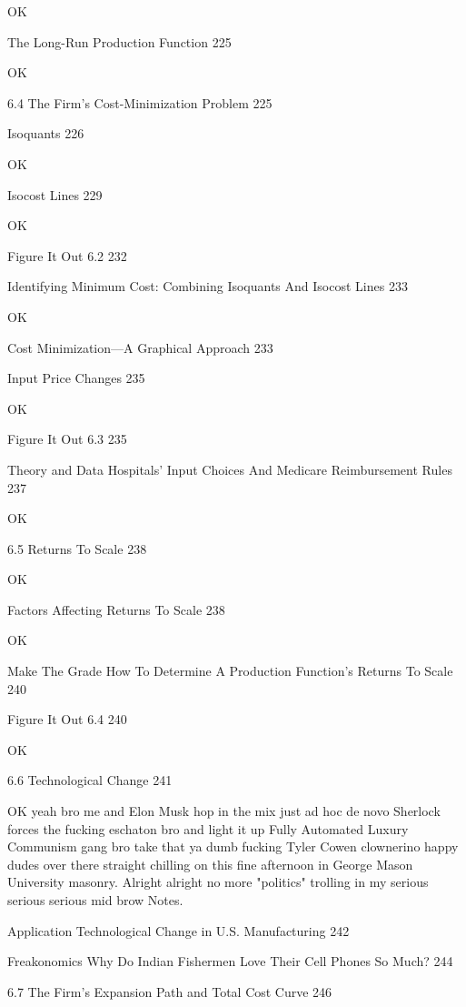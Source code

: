 OK

The Long-Run Production Function 225

OK

6.4 The Firm's Cost-Minimization Problem 225



Isoquants 226

OK

Isocost Lines 229

OK

Figure It Out 6.2 232



Identifying Minimum Cost: Combining Isoquants And Isocost Lines 233

OK

Cost Minimization—A Graphical Approach 233



Input Price Changes 235

OK

Figure It Out 6.3 235



Theory and Data Hospitals' Input Choices And Medicare Reimbursement Rules 237

OK

6.5 Returns To Scale 238

OK

Factors Affecting Returns To Scale 238

OK

Make The Grade How To Determine A Production Function's Returns To Scale 240



Figure It Out 6.4 240

OK

6.6 Technological Change 241

OK yeah bro me and Elon Musk hop in the mix just ad hoc de novo Sherlock forces the fucking eschaton bro and light it up Fully Automated Luxury Communism gang bro take that ya dumb fucking Tyler Cowen clownerino happy dudes over there straight chilling on this fine afternoon in George Mason University masonry. Alright alright no more "politics" trolling in my serious serious serious mid brow Notes.

Application Technological Change in U.S. Manufacturing 242



Freakonomics Why Do Indian Fishermen Love Their Cell Phones So Much? 244



6.7 The Firm's Expansion Path and Total Cost Curve 246

